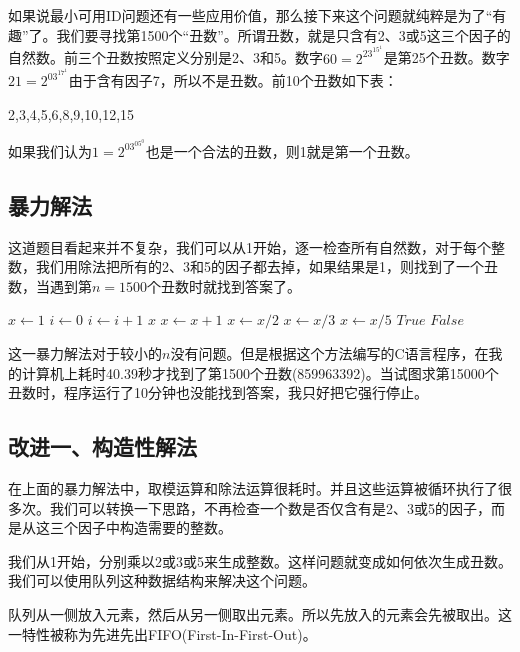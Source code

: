 \documentclass[UTF8]{article}
\begin{document}
如果说最小可用ID问题还有一些应用价值，那么接下来这个问题就纯粹是为了“有趣”了。我们要寻找第1500个“丑数”。所谓丑数，就是只含有2、3或5这三个因子的自然数。前三个丑数按照定义分别是2、3和5。数字$60 = 2^23^15^1$是第25个丑数。数字$21 = 2^03^17^1$由于含有因子7，所以不是丑数。前10个丑数如下表：

2,3,4,5,6,8,9,10,12,15

如果我们认为$1=2^03^05^0$也是一个合法的丑数，则1就是第一个丑数。

\subsection{暴力解法}

这道题目看起来并不复杂，我们可以从1开始，逐一检查所有自然数，对于每个整数，我们用除法把所有的2、3和5的因子都去掉，如果结果是1，则找到了一个丑数，当遇到第$n=1500$个丑数时就找到答案了。

\begin{algorithmic}[1]
  \State $x \gets 1$
  \State $i \gets 0$
  \Loop
      \State $i \gets i + 1$
        \State \Return $x$
      \EndIf
    \EndIf
    \State $x \gets x + 1$
  \EndLoop
\EndFunction
\Statex
{}
    \State $x \gets x / 2$
  \EndWhile
    \State $x \gets x / 3$
  \EndWhile
    \State $x \gets x / 5$
  \EndWhile
    \State \Return $True$
  \Else
    \State \Return $False$
  \EndIf
\EndFunction
\end{algorithmic}

这一暴力解法对于较小的$n$没有问题。但是根据这个方法编写的C语言程序，在我的计算机上耗时40.39秒才找到了第1500个丑数(859963392)。当试图求第15000个丑数时，程序运行了10分钟也没能找到答案，我只好把它强行停止。

\subsection{改进一、构造性解法}
在上面的暴力解法中，取模运算和除法运算很耗时\cite{Bentley}。并且这些运算被循环执行了很多次。我们可以转换一下思路，不再检查一个数是否仅含有是2、3或5的因子，而是从这三个因子中构造需要的整数。

我们从1开始，分别乘以2或3或5来生成整数。这样问题就变成如何依次生成丑数。我们可以使用队列这种数据结构来解决这个问题。

队列从一侧放入元素，然后从另一侧取出元素。所以先放入的元素会先被取出。这一特性被称为先进先出FIFO(First-In-First-Out)。
\end{document}
